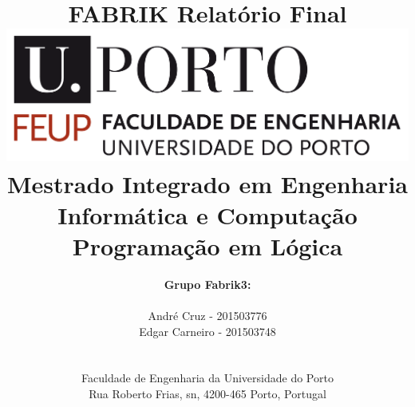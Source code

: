 \documentclass[a4paper]{article}
\begin{document}
\setlength{\textwidth}{16cm}
\setlength{\textheight}{22cm}

\title{\Huge\textbf{FABRIK}\linebreak\linebreak\linebreak
\Large\textbf{Relatório Final}\linebreak\linebreak
\linebreak\linebreak
\includegraphics[scale=0.1]{images/feup-logo.png}\linebreak\linebreak
\linebreak\linebreak
\Large{Mestrado Integrado em Engenharia Informática e Computação} \linebreak\linebreak
\Large{Programação em Lógica}\linebreak
}

\author{\textbf{Grupo Fabrik3:}\\
\linebreak\\
André Cruz - 201503776 \\
Edgar Carneiro - 201503748 \\
\linebreak\linebreak \\
 \\ Faculdade de Engenharia da Universidade do Porto \\ Rua Roberto Frias, s\/n, 4200-465 Porto, Portugal \linebreak\linebreak\linebreak
\linebreak\linebreak\vspace{1cm}}

\maketitle
\thispagestyle{empty}
\end{document}
